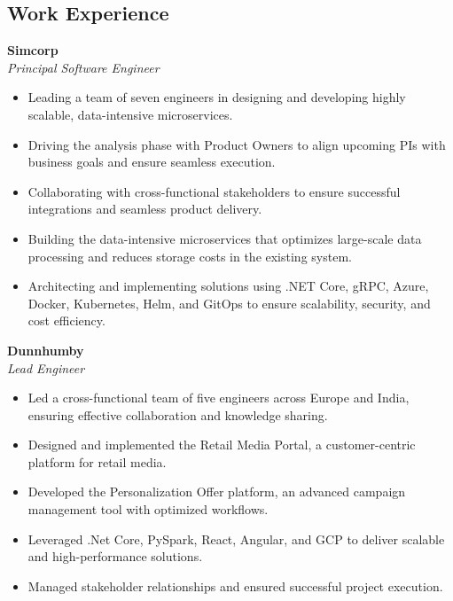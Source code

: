 \begin{tcolorbox}
\begin{minipage}[t]{0.7\textwidth}
\begin{tcolorbox}[grow to right by=0.75cm, height=0.8\textheight, colframe=white, colback=white]
               \section*{Work Experience}
                 \textbf{Simcorp} \hfill {} \\
                \textit{Principal Software Engineer}  
                \vspace{0.5em}
                \begin{itemize}
                    \item Leading a team of seven engineers in designing and developing highly scalable, data-intensive microservices.
                    \item Driving the analysis phase with Product Owners to align upcoming PIs with business goals and ensure seamless execution.
                    \item Collaborating with cross-functional stakeholders to ensure successful integrations and seamless product delivery.
                    \item Building the data-intensive microservices that optimizes large-scale data processing and reduces storage costs in the existing system.
                    \item Architecting and implementing solutions using .NET Core, gRPC, Azure, Docker, Kubernetes, Helm, and GitOps to ensure scalability, security, and cost efficiency.
                \end{itemize}

                \vspace{1 em}
                \textbf{Dunnhumby} \hfill {} \\
                \textit{Lead Engineer}  
                \begin{itemize}
                     \item Led a cross-functional team of five engineers across Europe and India, ensuring effective collaboration and knowledge sharing.
                    \item Designed and implemented the Retail Media Portal, a customer-centric platform for retail media.
                    \item Developed the Personalization Offer platform, an advanced campaign management tool with optimized workflows.
                    \item Leveraged .Net Core, PySpark, React, Angular, and GCP to deliver scalable and high-performance solutions.
                    \item Managed stakeholder relationships and ensured successful project execution.
                \end{itemize}
            \end{tcolorbox}
        \end{minipage}
    \end{tcolorbox}
    


